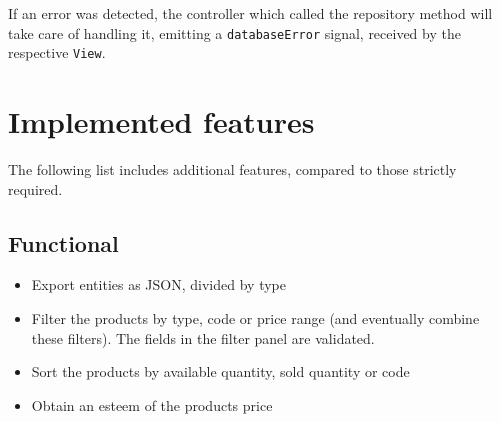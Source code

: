 \documentclass[10pt]{article}
\begin{document}
If an error was detected, the controller which called the repository method
will take care of handling it, emitting a \texttt{databaseError} signal,
received by the respective \texttt{View}.

\section{Implemented features}
The following list includes additional features, compared to those strictly
required.
\subsection{Functional}
\begin{itemize}
    \item Export entities as JSON, divided by type
    \item Filter the products by type, code or price range (and eventually combine these
          filters). The fields in the filter panel are validated.
    \item Sort the products by available quantity, sold quantity or code
    \item Obtain an esteem of the products price
\end{itemize}
\end{document}
